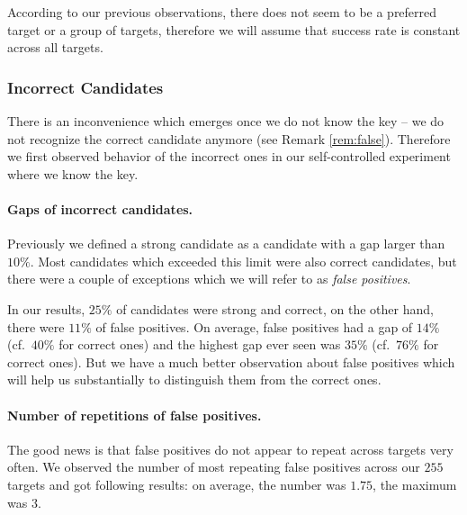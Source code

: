 	\begin{remark}
	\label{rem:uniform}
		According to our previous observations, there does not seem to be a preferred target or a group of targets, therefore we will assume that success rate is constant across all targets.
	\end{remark}

\subsubsection{Incorrect Candidates}
	
	There is an inconvenience which emerges once we do not know the key -- we do not recognize the correct candidate anymore (see Remark \ref{rem:false}). Therefore we first observed behavior of the incorrect ones in our self-controlled experiment where we know the key.
	
	\paragraph{Gaps of incorrect candidates.}
		
		Previously we defined a strong candidate as a candidate with a gap larger than $10\%$. Most candidates which exceeded this limit were also correct candidates, but there were a couple of exceptions which we will refer to as {\em false positives}.
		
		In our results, $25\%$ of candidates were strong and correct, on the other hand, there were $11\%$ of false positives. On average, false positives had a gap of $14\%$ (cf.\ $40\%$ for correct ones) and the highest gap ever seen was $35\%$ (cf.\ $76\%$ for correct ones). But we have a much better observation about false positives which will help us substantially to distinguish them from the correct ones.
	
	\paragraph{Number of repetitions of false positives.}
		
		The good news is that false positives do not appear to repeat across targets very often. We observed the number of most repeating false positives across our $255$ targets and got following results: on average, the number was $1.75$, the maximum was $3$.
		
